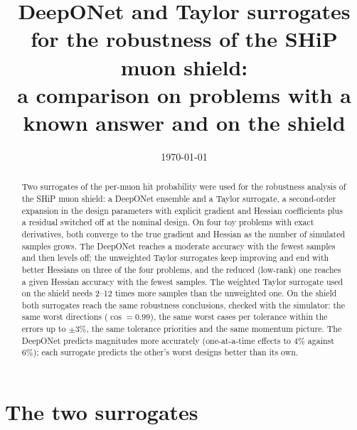 \documentclass[11pt,a4paper]{article}
\title{DeepONet and Taylor surrogates for the robustness of the SHiP muon shield:\\[0.3ex]
\large a comparison on problems with a known answer and on the shield}
\author{}
\date{\today}
\begin{document}
\maketitle

\begin{abstract}
Two surrogates of the per-muon hit probability were used for the robustness analysis of the SHiP
muon shield: a DeepONet ensemble and a Taylor surrogate, a second-order expansion in the design
parameters with explicit gradient and Hessian coefficients plus a residual switched off at the
nominal design. On four toy problems with exact derivatives, both converge to the true gradient
and Hessian as the number of simulated samples grows. The DeepONet reaches a moderate accuracy
with the fewest samples and then levels off; the unweighted Taylor surrogates keep improving and
end with better Hessians on three of the four problems, and the reduced (low-rank) one reaches a
given Hessian accuracy with the fewest samples. The weighted Taylor surrogate used on the shield
needs 2--12 times more samples than the unweighted one. On the shield both surrogates reach the
same robustness conclusions, checked with the simulator: the same worst directions ($\cos=0.99$),
the same worst cases per tolerance within the errors up to $\pm3\%$, the same tolerance priorities
and the same momentum picture. The DeepONet predicts magnitudes more accurately (one-at-a-time
effects to $4\%$ against $6\%$); each surrogate predicts the other's worst designs better than its
own.
\end{abstract}

\tableofcontents

\section{The two surrogates}
\end{document}
